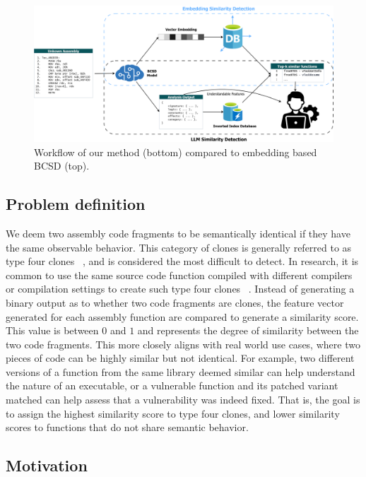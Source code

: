 \begin{figure}
\centerline{\includegraphics[width=\linewidth]{BCSD-schematic}}
\caption{Workflow of our method (bottom) compared to embedding based BCSD (top).}
\label{BCSD-workflow}
\end{figure}

\subsection{Problem definition}

We deem two assembly code fragments to be semantically identical if they have the same observable behavior.
This category of clones is generally referred to as type four clones ~\cite{Asm2Vec,BinClone}, and is considered the most difficult
to detect. In research, it is common to use the same source code function compiled with different compilers or compilation
settings to create such type four clones ~\cite{SAFE,PalmTree,OrderMatters,Asm2Vec,CLAP}. Instead of generating a binary output as
to whether two code fragments are clones, the feature vector generated for each assembly function are compared to generate a similarity score.
This value is between \(0\) and \(1\) and represents the degree of similarity between the two code fragments. This more closely aligns with
real world use cases, where two pieces of code can be highly similar but not identical. For example, two different versions of a function
from the same library deemed similar can help understand the nature of an executable, or a vulnerable function and its patched variant matched
can help assess that a vulnerability was indeed fixed. That is, the goal is to assign the highest similarity score to type four
clones, and lower similarity scores to functions that do not share semantic behavior. 

\subsection{Motivation}

